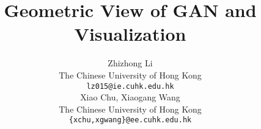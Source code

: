 \documentclass{article}
\title{Geometric View of GAN and Visualization}
\author{
    Zhizhong Li \\
    The Chinese University of Hong Kong\\
    \texttt{lz015@ie.cuhk.edu.hk} \\
    \And
    Xiao Chu, Xiaogang Wang \\
    The Chinese University of Hong Kong \\
    \texttt{\{xchu,xgwang\}@ee.cuhk.edu.hk} \\
}
\begin{document}
\maketitle









\FloatBarrier


\end{document}
